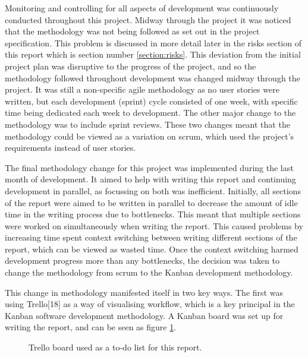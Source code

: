 \documentclass{article}
\begin{document}
Monitoring and controlling for all aspects of development was continuously conducted throughout this project. Midway through the project it was noticed that the methodology was not being followed as set out in the project specification. This problem is discussed in more detail later in the risks section of this report which is section number \ref{section:risks}. This deviation from the initial project plan was disruptive to the progress of the project, and so the methodology followed throughout development was changed midway through the project. It was still a non-specific agile methodology as no user stories were written, but each development (sprint) cycle consisted of one week, with specific time being dedicated each week to development. The other major change to the methodology was to include sprint reviews. These two changes meant that the methodology could be viewed as a variation on scrum, which used the project's requirements instead of user stories. \par

The final methodology change for this project was implemented during the last month of development. It aimed to help with writing this report and continuing development in parallel, as focussing on both was inefficient. Initially, all sections of the report were aimed to be written in parallel to decrease the amount of idle time in the writing process due to bottlenecks. This meant that multiple sections were worked on simultaneously when writing the report. This caused problems by increasing time spent context switching between writing different sections of the report, which can be viewed as wasted time. Once the context switching harmed development progress more than any bottlenecks, the decision was taken to change the methodology from scrum to the Kanban development methodology. \par

This change in methodology manifested itself in two key ways. The first was using Trello[18] as a way of visualising workflow, which is a key principal in the Kanban software development methodology. A Kanban board was set up for writing the report, and can be seen as figure \ref{figure:trelloBoardOG}. \par

\begin{figure}[H]
	\centering
	\caption{Trello board used as a to-do list for this report.}
	\label{figure:trelloBoardOG}
\end{figure}
\end{document}
